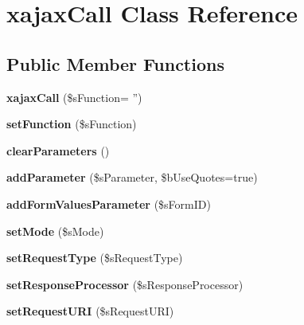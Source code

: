 \hypertarget{classxajaxCall}{
\section{xajaxCall Class Reference}
\label{classxajaxCall}
}
\subsection*{Public Member Functions}
\begin{DoxyCompactItemize}
\item 
\hypertarget{classxajaxCall_ab689f1cd56f19ee1b8fcf92c4c4443b5}{
{\bfseries xajaxCall} (\$sFunction= '')}
\label{classxajaxCall_ab689f1cd56f19ee1b8fcf92c4c4443b5}

\item 
\hypertarget{classxajaxCall_a86bac7b6175e717a95abc39288c732f7}{
{\bfseries setFunction} (\$sFunction)}
\label{classxajaxCall_a86bac7b6175e717a95abc39288c732f7}

\item 
\hypertarget{classxajaxCall_a5f8af5744c53504097952e68cd21837b}{
{\bfseries clearParameters} ()}
\label{classxajaxCall_a5f8af5744c53504097952e68cd21837b}

\item 
\hypertarget{classxajaxCall_a39222dded1c43dbdae9c62086dc37406}{
{\bfseries addParameter} (\$sParameter, \$bUseQuotes=true)}
\label{classxajaxCall_a39222dded1c43dbdae9c62086dc37406}

\item 
\hypertarget{classxajaxCall_ab84c87dc19c508d4f0d4b522c67a90a8}{
{\bfseries addFormValuesParameter} (\$sFormID)}
\label{classxajaxCall_ab84c87dc19c508d4f0d4b522c67a90a8}

\item 
\hypertarget{classxajaxCall_ac72f8d8002773c31d7e412577f07d2b5}{
{\bfseries setMode} (\$sMode)}
\label{classxajaxCall_ac72f8d8002773c31d7e412577f07d2b5}

\item 
\hypertarget{classxajaxCall_a8f2a8dd89da72b25ad9b13ef4d7fce41}{
{\bfseries setRequestType} (\$sRequestType)}
\label{classxajaxCall_a8f2a8dd89da72b25ad9b13ef4d7fce41}

\item 
\hypertarget{classxajaxCall_a70207233b1174f8f2a30bce23797a45a}{
{\bfseries setResponseProcessor} (\$sResponseProcessor)}
\label{classxajaxCall_a70207233b1174f8f2a30bce23797a45a}

\item 
\hypertarget{classxajaxCall_abffd3cf211186edee831e284017d0af3}{
{\bfseries setRequestURI} (\$sRequestURI)}
\label{classxajaxCall_abffd3cf211186edee831e284017d0af3}


\end{DoxyCompactItemize}
